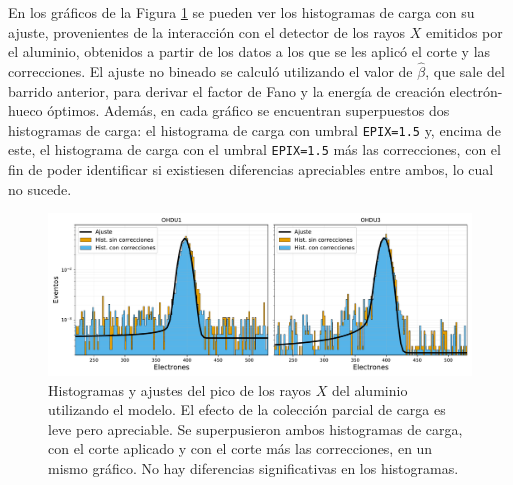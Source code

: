En los gráficos de la Figura \ref{fig:Al_OHDU1y3_EPIX15_Corr} se pueden ver los histogramas de carga con su ajuste, provenientes de la interacción con el detector de los rayos $X$ emitidos por el aluminio, obtenidos a partir de los datos a los que se les aplicó el corte y las correcciones. El ajuste no bineado se calculó utilizando el valor de $\hat{\beta}$, que sale del barrido anterior, para derivar el factor de Fano y la energía de creación electrón-hueco óptimos. Además, en cada gráfico se encuentran superpuestos dos histogramas de carga: el histograma de carga con umbral \verb|EPIX=1.5| y, encima de este, el histograma de carga con el umbral \verb|EPIX=1.5| más las correcciones, con el fin de poder identificar si existiesen diferencias apreciables entre ambos, lo cual no sucede.
\begin{figure}[h]
    \centering
        \includegraphics[scale=0.5]{Figs/Al_hists_ohdu1y3_dobles.pdf}
    \caption{Histogramas y ajustes del pico de los rayos $X$ del aluminio utilizando el modelo. El efecto de la colección parcial de carga es leve pero apreciable. Se superpusieron ambos histogramas de carga, con el corte aplicado y con el corte más las correcciones, en un mismo gráfico. No hay diferencias significativas en los histogramas.}
    \label{fig:Al_OHDU1y3_EPIX15_Corr}
\end{figure}

